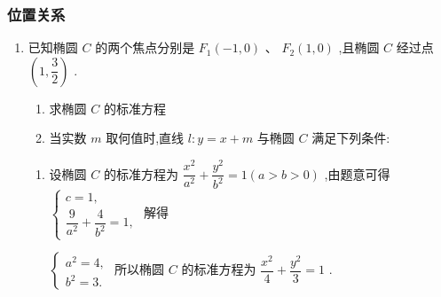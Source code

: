 \subsubsection*{位置关系}
\begin{enumerate}
    \item 已知椭圆 $C$ 的两个焦点分别是 ${F}_{1}\left( {-1,0}\right)$ 、 ${F}_{2}\left( {1,0}\right)$ ,且椭圆 $C$ 经过点 $\left( {1,\dfrac{3}{2}}\right)$ .
    \begin{enumerate}
        \item 求椭圆 $C$ 的标准方程
        \item 当实数 $m$ 取何值时,直线 $l : y = x + m$ 与椭圆 $C$ 满足下列条件:
    \end{enumerate}
    \begin{jieda}
        \begin{enumerate}
            \item 设椭圆 $C$ 的标准方程为 $\dfrac{{x}^{2}}{{a}^{2}} + \dfrac{{y}^{2}}{{b}^{2}} = 1\left( {a > b > 0}\right)$ ,由题意可得 $\left\{  \begin{array}{l} c = 1, \\ 
            \dfrac{9}{{a}^{2}} + \dfrac{4}{{b}^{2}} = 1, \end{array}\right.$ 解得

            $\left\{  \begin{array}{l} {a}^{2} = 4, \\  {b}^{2} = 3. \end{array}\right.$ 所以椭圆 $C$ 的标准方程为 $\dfrac{{x}^{2}}{4} + \dfrac{{y}^{2}}{3} = 1$ .
            

\end{enumerate}
\end{jieda}
\end{enumerate}
